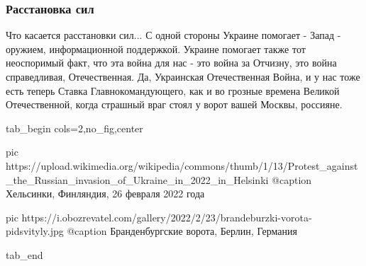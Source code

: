  
 
 
 
 

\subsubsection{Расстановка сил}

Что касается расстановки сил... С одной стороны Украине помогает - Запад -
оружием, информационной поддержкой. Украине помогает также тот неоспоримый
факт, что эта война для нас - это война за Отчизну, это война справедливая,
Отечественная. Да, Украинская Отечественная Война, и у нас тоже есть теперь
Ставка Главнокомандующего, как и во грозные времена Великой Отечественной,
когда страшный враг стоял у ворот вашей Москвы, россияне.

\ifcmt
  tab_begin cols=2,no_fig,center

     pic https://upload.wikimedia.org/wikipedia/commons/thumb/1/13/Protest_against_the_Russian_invasion_of_Ukraine_in_2022_in_Helsinki%
		 @caption Хельсинки, Финляндия, 26 февраля 2022 года
		 
		 pic https://i.obozrevatel.com/gallery/2022/2/23/brandeburzki-vorota-pidsvityly.jpg
		 @caption Бранденбургские ворота, Берлин, Германия

  tab_end
\fi

